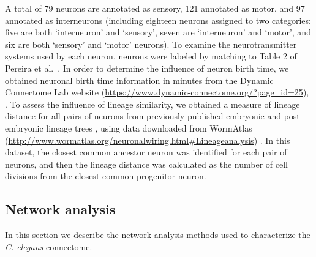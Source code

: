 \documentclass[10pt,letterpaper]{article}
\begin{document}
A total of 79 neurons are annotated as sensory, 121 annotated as motor, and 97 annotated as interneurons (including eighteen neurons assigned to two categories: five are both `interneuron' and `sensory', seven are `interneuron' and `motor', and six are both `sensory' and `motor' neurons).
To examine the neurotransmitter systems used by each neuron, neurons were labeled by matching to Table 2 of Pereira et al.~\cite{Pereira:2015er}.
In order to determine the influence of neuron birth time, we obtained neuronal birth time information in minutes from the Dynamic Connectome Lab website (\url{https://www.dynamic-connectome.org/?page_id=25}), \cite{Varier2011}.
To assess the influence of lineage similarity, we obtained a measure of lineage distance for all pairs of neurons from previously published embryonic and post-embryonic lineage trees \cite{Sulston1977, Sulston1983}, using data downloaded from WormAtlas (\url{http://www.wormatlas.org/neuronalwiring.html#Lineageanalysis}) \cite{WormAtlas}.
In this dataset, the closest common ancestor neuron was identified for each pair of neurons, and then the lineage distance was calculated as the number of cell divisions from the closest common progenitor neuron.


\subsection*{Network analysis}
In this section we describe the network analysis methods used to characterize the \emph{C. elegans} connectome.
\end{document}
